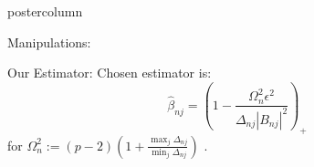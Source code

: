 \documentclass[final]{beamer}
\newtheorem{propo}{Proposition}
\begin{document}
\begin{frame}
\begin{columns}
\begin{column}{.32\textwidth}
\begin{beamercolorbox}[center,wd=\textwidth]{postercolumn}
\begin{minipage}[T]{.95\textwidth}
{\begin{block}{Manipulations:}

\end{block}
\begin{block}{Our Estimator:}
Chosen estimator is:
\begin{equation}
\hat\beta_{nj} = \left( 1 - \frac{\Omega_n^2 \epsilon^2}{\Delta_{nj} |B_{nj}|^2} \right)_+
\label{eq:betaEstimator}
\end{equation}
for $\Omega_n^2 := (p-2)\left(1 + \frac{\max_j \Delta_{nj}}{\min_j \Delta_{nj}}\right)$ . \\


\end{block}}
\end{minipage}
\end{beamercolorbox}
\end{column}
\end{columns}
\end{frame}
\end{document}
